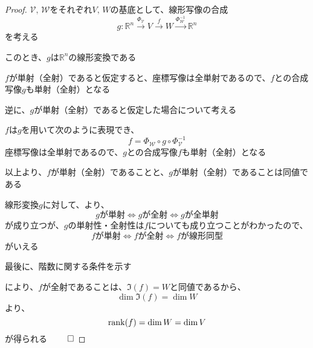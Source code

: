 \documentclass[../../../topic_linear-algebra]{subfiles}
\begin{document}
\begin{proof}
  $\mathcal{V},\,\mathcal{W}$をそれぞれ$V,\,W$の基底として、線形写像の合成
  \begin{equation*}
    g\colon \mathbb{R}^n \xrightarrow{\Phi_\mathcal{V}} V \xrightarrow{f} W \xrightarrow{\Phi_\mathcal{W}^{-1}} \mathbb{R}^n
  \end{equation*}
  を考える

  このとき、$g$は$\mathbb{R}^n$の線形変換である

  \br

  $f$が単射（全射）であると仮定すると、座標写像は全単射であるので、$f$との合成写像$g$も単射（全射）となる

  \br

  逆に、$g$が単射（全射）であると仮定した場合について考える

  $f$は$g$を用いて次のように表現でき、
  \begin{equation*}
    f = \Phi_\mathcal{W} \circ g \circ \Phi_\mathcal{V}^{-1}
  \end{equation*}
  座標写像は全単射であるので、$g$との合成写像$f$も単射（全射）となる

  \br

  以上より、$f$が単射（全射）であることと、$g$が単射（全射）であることは同値である

  \br

  線形変換$g$に対して、より、
  \begin{equation*}
    g\text{が単射} \Longleftrightarrow g\text{が全射} \Longleftrightarrow g\text{が全単射}
  \end{equation*}
  が成り立つが、$g$の単射性・全射性は$f$についても成り立つことがわかったので、
  \begin{equation*}
    f\text{が単射} \Longleftrightarrow f\text{が全射} \Longleftrightarrow f\text{が線形同型}
  \end{equation*}
  がいえる

  \br

  最後に、階数に関する条件を示す

  により、$f$が全射であることは、$\Im(f) = W$と同値であるから、
  \begin{equation*}
    \dim \Im(f) = \dim W
  \end{equation*}
  より、
  \begin{equation*}
    \rank(f) = \dim W = \dim V
  \end{equation*}
  が得られる $\qed$
\end{proof}
\end{document}

